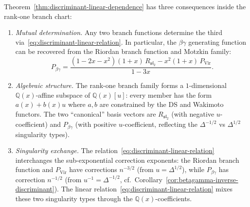 \begin{remark}\label{rem:linear-dependence-consequences}
Theorem~\ref{thm:discriminant-linear-dependence} has three consequences
inside the rank-one branch chart:
\begin{enumerate}
\item \emph{Mutual determination.}
Any two branch functions determine the third via~\eqref{eq:discriminant-linear-relation}. In particular, the $\beta\gamma$ generating function can be recovered from the Riordan branch function and Motzkin family:
\[
P_{\beta\gamma} = \frac{(1{-}2x{-}x^2)(1{+}x)\, R_{\mathfrak{sl}_2}
 - x^2(1{+}x)\, P_{\mathrm{Vir}}}{1{-}3x}.
\]
\item \emph{Algebraic structure.}
The rank-one branch family forms a $1$-dimensional
$\mathbb{Q}(x)$-affine subspace of $\mathbb{Q}(x)[u]$:
every member has the form $a(x) + b(x)u$ where
$a, b$ are constrained by the DS and Wakimoto functors.
The two ``canonical'' basis vectors are
$R_{\mathfrak{sl}_2}$ (with negative $u$-coefficient)
and $P_{\beta\gamma}$ (with positive $u$-coefficient, reflecting the
$\Delta^{-1/2}$ vs $\Delta^{1/2}$ singularity types).
\item \emph{Singularity exchange.}
The relation~\eqref{eq:discriminant-linear-relation} interchanges
the sub-exponential correction exponents:
the Riordan branch function and $P_{\mathrm{Vir}}$ have corrections
$n^{-3/2}$ (from $u = \Delta^{1/2}$),
while $P_{\beta\gamma}$ has correction $n^{-1/2}$
(from $u^{-1} = \Delta^{-1/2}$, cf.\ Corollary~\ref{cor:betagamma-inverse-discriminant}).
The linear relation~\eqref{eq:discriminant-linear-relation}
mixes these two singularity types through the
$\mathbb{Q}(x)$-coefficients.
\end{enumerate}
\end{remark}

